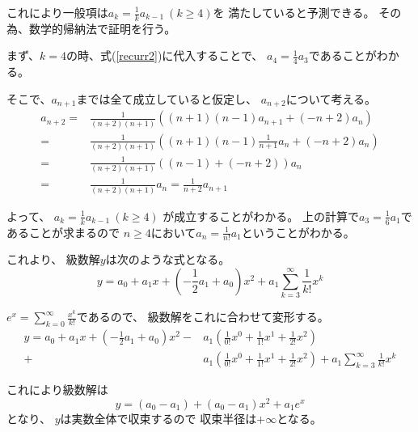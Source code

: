 \documentclass[12pt,b5paper]{ltjsarticle}
\begin{document}
これにより一般項は$a_k=\frac{1}{k}a_{k-1}\ (k\geq 4)$を
満たしていると予測できる。
その為、数学的帰納法で証明を行う。

まず、$k=4$の時、式(\ref{recurr2})に代入することで、
$a_4=\frac{1}{4}a_3$であることがわかる。

そこで、$a_{n+1}$までは全て成立していると仮定し、
$a_{n+2}$について考える。
\begin{align}
 a_{n+2}
  =& \frac{1}{(n+2)(n+1)}(
   (n+1)(n-1)a_{n+1} +(-n+2)a_n
 )\\
 =& \frac{1}{(n+2)(n+1)}(
   (n+1)(n-1)\frac{1}{n+1}a_n +(-n+2)a_n
 )\\
 =& \frac{1}{(n+2)(n+1)}( (n-1)+(-n+2) )a_n\\
 =& \frac{1}{(n+2)(n+1)}a_n
 = \frac{1}{n+2}a_{n+1}
\end{align}

よって、
$a_k=\frac{1}{k}a_{k-1}\ (k\geq 4)$
が成立することがわかる。
上の計算で$a_3=\frac{1}{6}a_1$であることが求まるので
$n\geq 4$において$a_n=\frac{1}{n!}a_1$ということがわかる。

これより、
級数解$y$は次のような式となる。
\begin{equation}
 y=a_0+a_1x+ \left(-\frac{1}{2}a_1+a_0\right)x^2 + a_1\sum_{k=3}^{\infty}\frac{1}{k!}x^k
\end{equation}

$e^x = \sum_{k=0}^{\infty}\frac{x^k}{k!}$であるので、
級数解をこれに合わせて変形する。
\begin{equation}
 \begin{split}
 y = a_0 + a_1x + \left(-\frac{1}{2}a_1+a_0 \right)x^2
  -& a_1\left( \frac{1}{0!}x^0 + \frac{1}{1!}x^1 + \frac{1}{2!}x^2 \right)\\
  +& a_1\left( \frac{1}{0!}x^0 + \frac{1}{1!}x^1 + \frac{1}{2!}x^2 \right)
  + a_1\sum_{k=3}^{\infty}\frac{1}{k!}x^k
 \end{split}
\end{equation}

これにより級数解は
\begin{equation}
 y = (a_0-a_1) + (a_0-a_1)x^2 + a_1 e^x
\end{equation}
となり、
$y$は実数全体で収束するので
収束半径は$+\infty$となる。
\end{document}
